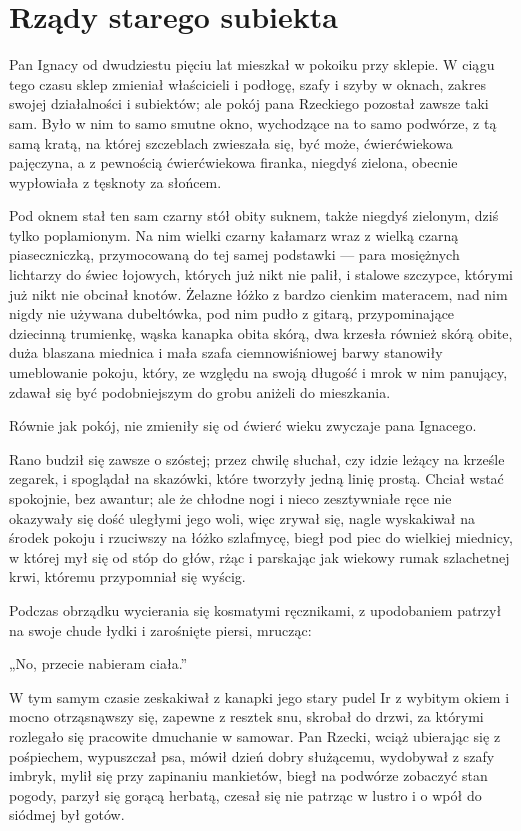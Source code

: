 \documentclass{book}
\begin{document}
\chapter{Rządy starego subiekta}

Pan Ignacy od dwudziestu pięciu lat mieszkał w pokoiku przy sklepie. W ciągu tego czasu sklep zmieniał właścicieli i podłogę, szafy i szyby w oknach, zakres swojej działalności i subiektów; ale pokój pana Rzeckiego pozostał zawsze taki sam. Było w nim to samo smutne okno, wychodzące na to samo podwórze, z tą samą kratą, na której szczeblach zwieszała się, być może, ćwierćwiekowa pajęczyna, a z pewnością ćwierćwiekowa firanka, niegdyś zielona, obecnie wypłowiała z tęsknoty za słońcem.

Pod oknem stał ten sam czarny stół obity suknem, także niegdyś zielonym, dziś tylko poplamionym. Na nim wielki czarny kałamarz wraz z wielką czarną piaseczniczką, przymocowaną do tej samej podstawki — para mosiężnych lichtarzy do świec łojowych, których już nikt nie palił, i stalowe szczypce, którymi już nikt nie obcinał knotów. Żelazne łóżko z bardzo cienkim materacem, nad nim nigdy nie używana dubeltówka, pod nim pudło z gitarą, przypominające dziecinną trumienkę, wąska kanapka obita skórą, dwa krzesła również skórą obite, duża blaszana miednica i mała szafa ciemnowiśniowej barwy stanowiły umeblowanie pokoju, który, ze względu na swoją długość i mrok w nim panujący, zdawał się być podobniejszym do grobu aniżeli do mieszkania.

Równie jak pokój, nie zmieniły się od ćwierć wieku zwyczaje pana Ignacego.

Rano budził się zawsze o szóstej; przez chwilę słuchał, czy idzie leżący na krześle zegarek, i spoglądał na skazówki, które tworzyły jedną linię prostą. Chciał wstać spokojnie, bez awantur; ale że chłodne nogi i nieco zesztywniałe ręce nie okazywały się dość uległymi jego woli, więc zrywał się, nagle wyskakiwał na środek pokoju i rzuciwszy na łóżko szlafmycę, biegł pod piec do wielkiej miednicy, w której mył się od stóp do głów, rżąc i parskając jak wiekowy rumak szlachetnej krwi, któremu przypomniał się wyścig.

Podczas obrządku wycierania się kosmatymi ręcznikami, z upodobaniem patrzył na swoje chude łydki i zarośnięte piersi, mrucząc:

„No, przecie nabieram ciała.”

W tym samym czasie zeskakiwał z kanapki jego stary pudel Ir z wybitym okiem i mocno otrząsnąwszy się, zapewne z resztek snu, skrobał do drzwi, za którymi rozlegało się pracowite dmuchanie w samowar. Pan Rzecki, wciąż ubierając się z pośpiechem, wypuszczał psa, mówił dzień dobry służącemu, wydobywał z szafy imbryk, mylił się przy zapinaniu mankietów, biegł na podwórze zobaczyć stan pogody, parzył się gorącą herbatą, czesał się nie patrząc w lustro i o wpół do siódmej był gotów.
\end{document}
